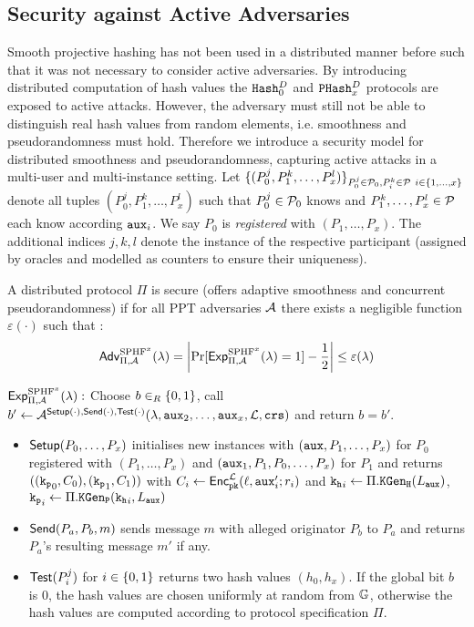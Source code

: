 \subsection{Security against Active Adversaries}
Smooth projective hashing has not been used in a distributed manner before such that it was not necessary to consider active adversaries.
By introducing distributed computation of hash values the $\mathtt{Hash}_0^D$ and $\mathtt{PHash}_x^D$ protocols are exposed to active attacks.
However, the adversary must still not be able to distinguish real hash values from random elements, i.e. smoothness and pseudorandomness must hold.
Therefore we introduce a security model for distributed \SPHFF smoothness and pseudorandomness, capturing active attacks in a multi-user and multi-instance setting.
Let $\{(P^j_0,P^k_1,\dots,P^l_x)\}_{P_0^j\in\mathcal{P}_0,P^k_i\in\mathcal{P}~i\in\{1,\dots,x\}}$ denote all tuples $(P^j_0,P^k_1,\dots,P^l_x)$ such that $P^j_0\in\mathcal{P}_0$ knows \aux and $P^k_1,\dots,P^l_x\in\mathcal{P}$ each know according $\mathtt{aux}_i$.
We say $P_0$ is \emph{registered} with $(P_1,\dots,P_x)$.
The additional indices $j,k,l$ denote the instance of the respective participant (assigned by oracles and modelled as counters to ensure their uniqueness).

\begin{definition}\label{def:activesphff}
A distributed \SPHFF protocol $\Pi$ is secure (offers adaptive smoothness and concurrent pseudorandomness) if for all PPT adversaries $\mathcal{A}$ there exists a negligible function $\varepsilon(\cdot)$ such that :
\[\mathsf{Adv}_{\Pi,\mathcal{A}}^{\text{SPHF}^x}(\lambda)=\left|\Pr[\mathsf{Exp}^{\text{SPHF}^x}_{\Pi,\mathcal{A}}(\lambda)=1]-\frac12\right|\leq\varepsilon(\lambda)\]

\noindent
$\mathsf{Exp}^{\text{SPHF}^x}_{\Pi,\mathcal{A}}(\lambda):$ Choose $b\in_R\{0,1\}$, call $b'\gets\mathcal{A}^{\mathsf{Setup}(\cdot),\mathsf{Send}(\cdot),\mathsf{Test}(\cdot)}(\lambda,\mathtt{aux}_2,\dots,\allowbreak \mathtt{aux}_x,\mathcal{L},\mathtt{crs})$ and return $b=b'$.

\begin{itemize}
	\item $\mathsf{Setup}(P_0,\dots,P_x)$ initialises new instances with $(\mathtt{aux},P_1,\dots,P_x)$ for $P_0$ registered with $(P_1,\dots,P_x)$ and $(\mathtt{aux}_1,P_1,P_0,\dots,P_x)$ for $P_1$ and returns $((\mathtt{k_p}_0,\allowbreak C_0),(\mathtt{k_p}_1,C_1))$ with $C_i\gets\mathsf{Enc}_{\mathtt{pk}}^{\mathcal{L}}(\ell,\mathtt{aux}'_i;r_i)$ and $\mathtt{k_h}_i\gets\Pi.\mathtt{KGen_H}(L_\mathtt{aux})$, $\mathtt{k_p}_i\gets\Pi.\mathtt{KGen_P}(\mathtt{k_h}_i,L_\mathtt{aux})$
		
	\item $\mathsf{Send}(P_a,P_b,m)$ sends message $m$ with alleged originator $P_b$ to $P_a$ and returns $P_a$'s resulting message $m'$ if any.
	
	\item $\mathsf{Test}(P_i^j)$ for $i\in\{0,1\}$ returns two hash values $(h_0,h_x)$. If the global bit $b$ is $0$, the hash values are chosen uniformly at random from $\mathbb{G}$, otherwise the hash values are computed according to protocol specification $\Pi$.
\end{itemize}
\end{definition}

